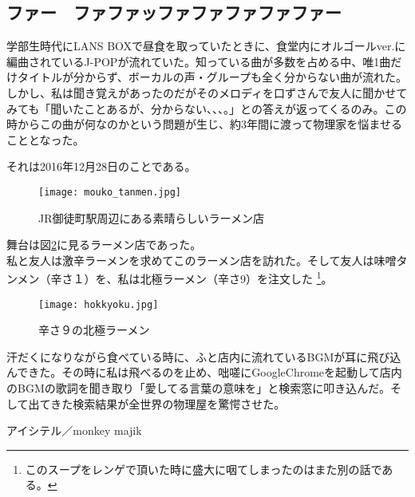 \newpage
\subsection{ファー　ファファッファファファファファー}
学部生時代にLANS BOXで昼食を取っていたときに、食堂内にオルゴールver.に編曲されているJ-POPが流れていた。知っている曲が多数を占める中、唯1曲だけタイトルが分からず、ボーカルの声・グループも全く分からない曲が流れた。しかし、私は聞き覚えがあったのだがそのメロディを口ずさんで友人に聞かせてみても「聞いたことあるが、分からない、、、。」との答えが返ってくるのみ。この時からこの曲が何なのかという問題が生じ、約3年間に渡って物理家を悩ませることとなった。\par
それは2016年12月28日のことである。
\begin{figure}[h]
  \centering
  \texttt{[image: mouko\_tanmen.jpg]}
  \caption[]{JR御徒町駅周辺にある素晴らしいラーメン店}
  \label{fig_hoge1}
\end{figure}
舞台は図\ref{fig_hoge2}に見るラーメン店であった。\\私と友人は激辛ラーメンを求めてこのラーメン店を訪れた。そして友人は味噌タンメン（辛さ１）を、私は北極ラーメン（辛さ9）を注文した
\footnote{このスープをレンゲで頂いた時に盛大に咽てしまったのはまた別の話である。}。
\begin{figure}[h]
  \centering
  \texttt{[image: hokkyoku.jpg]}
  \caption[]{辛さ９の北極ラーメン}
  \label{fig_hoge2}
\end{figure}
汗だくになりながら食べている時に、ふと店内に流れているBGMが耳に飛び込んできた。その時に私は飛べるのを止め、咄嗟にGoogleChromeを起動して店内のBGMの歌詞を聞き取り「愛してる言葉の意味を」と検索窓に叩き込んだ。そして出てきた検索結果が全世界の物理屋を驚愕させた。\\
\begin{center}
アイシテル／monkey majik
\end{center}
